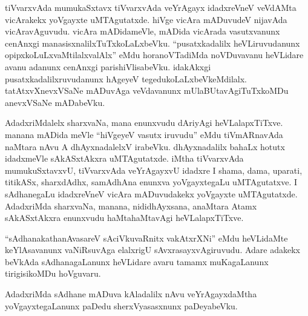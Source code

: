 tiVvarxvAda mumukaSxtavx tiVvarxvAda veYrAgayx idadxreVneV veVdAMta vicArakekx yoVgayxte uMTAgutatxde. hiVge vicAra mADuvudeV nijavAda vicAravAguvudu. vicAra mADidameVle, mADida vicArada vasutxvanunx cenAnxgi manasisxnalilxTuTxkoLaLxbeVku. ``pusatxkadalilx heVLiruvudanunx opipxkoLuLxvaMtilalxvalAlx'' eMdu horanoVTadiMda noVDuvavanu heVLidare avanu adanunx cenAnxgi parishiVlisabeVku. idakAkxgi pusatxkadalilxruvudanunx hAgeyeV tegedukoLaLxbeVkeMdilalx. tatAtxvXnevxVSaNe mADuvAga veVdavanunx mUlaBUtavAgiTuTxkoMDu anevxVSaNe mADabeVku.

AdadxriMdalelx sharxvaNa, mana enunxvudu dAriyAgi heVLalapxTiTxve. manana mADida meVle ``hiVgeyeV vasutx iruvudu'' eMdu tiVmARnavAda naMtara nAvu A dhAyxnadalelxV irabeVku. dhAyxnadalilx bahaLx hotutx idadxmeVle sAkASxtAkxra uMTAgutatxde. iMtha tiVvarxvAda mumukuSxtavxvU, tiVvarxvAda veYrAgayxvU idadxre I shama, dama, uparati, titikASx, sharxdAdhx, samAdhAna enunxva yoVgayxtegaLu uMTAgutatxve. I sAdhanegaLu idadxreVneV vicAra mADuvudakekx yoVgayxte uMTAgutatxde. AdadxriMda sharxvaNa, manana, nididhAyxsana, anaMtara Atamx sAkASxtAkxra enunxvudu haMtahaMtavAgi heVLalapxTiTxve.

``sAdhanakathanAvasareV sAciVkuvaRnitx vakAtxrXNi'' eMdu heVLidaMte keYlAsavanunx vaNiRsuvAga elalxrigU sAvxrasayxvAgiruvudu. Adare adakekx beVkAda sAdhanagaLanunx heVLidare avaru tamamx muKagaLanunx tirigisikoMDu hoVguvaru.

AdadxriMda sAdhane mADuva kAladalilx nAvu veYrAgayxdaMtha yoVgayxtegaLanunx paDedu sherxVyasasxnunx paDeyabeVku.


\endchapter
